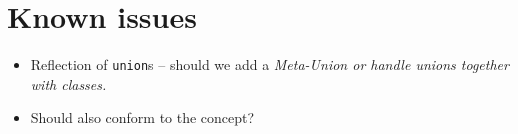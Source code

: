 \section{Known issues}

\begin{itemize}

\item{Reflection of \texttt{union}s -- should we add a \em{Meta-Union} or
handle unions together with classes.}

\item{Should  also conform to the  concept?}

\end{itemize}
